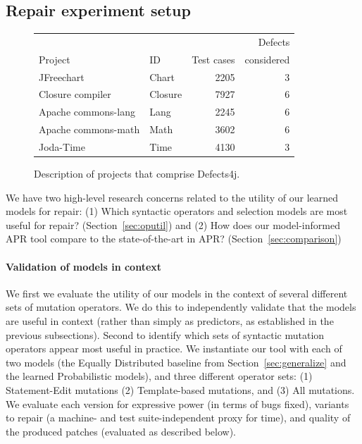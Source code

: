 \documentclass[conference]{IEEEtran}
\newcommand{\todo}[1]
  {{\scriptsize \textbf{\color{red} {#1}}}}
\begin{document}
\subsection{Repair experiment setup}
\label{sec:repairSetup}

\begin{figure}[ht]
\centering

\begin{tabular}{llrr}
\toprule
         &     &            &  Defects\\
 Project & ID & Test cases & considered \\
\midrule
JFreechart & Chart & 2205 & 3\\
Closure compiler & Closure & 7927 & 6\\
Apache commons-lang & Lang  & 2245 & 6\\
Apache commons-math & Math & 3602 & 6\\
Joda-Time & Time & 4130 & 3\\
\bottomrule
\end{tabular}
\center
  \caption{Description of projects that comprise Defects4j. \label{defects4j}}
\end{figure} 


We have two high-level research concerns related to the utility of our
learned models for repair: 
(1) Which syntactic operators and selection models are most
  useful for repair? (Section~\ref{sec:oputil}) and (2)
How does our model-informed APR tool compare to the
    state-of-the-art in APR? (Section~\ref{sec:comparison})

\paragraph{Validation of models in context} We first we evaluate the utility of our models in the
context of several different sets of mutation operators.  We do this to
independently validate that the models are useful in context (rather than simply
as predictors, as established in the previous subsections). Second to
identify which sets of syntactic mutation operators appear most useful in
practice. We
instantiate our tool with each of 
two models (the Equally Distributed baseline from Section~\ref{sec:generalize}
and the learned Probabilistic models), and three different operator sets: (1) Statement-Edit mutations (2)
Template-based mutations, and (3) All mutations. We evaluate each version
for expressive power (in terms of bugs fixed), variants to repair (a machine-
and test suite-independent proxy for time), and quality of the produced patches
(evaluated as described below). 
\end{document}
